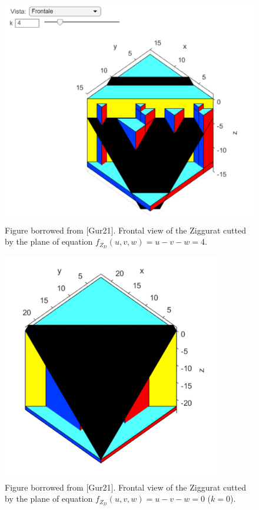 \documentclass[english, LaM, oneside, noexaminfo]{sapthesis}
\begin{document}
\begin{figure}[tb]
\centering
\includegraphics[height=10cm]{Ziggurat 3D.png}
\caption{Figure borrowed from [Gur21]. Frontal view of the Ziggurat cutted by the plane of equation $f_{Z_D}(u,v,w) = u-v-w = 4$.}\label{fig:Ziggurat 3D}
\end{figure}

\begin{figure}[tb]
\centering
\includegraphics[height=10cm]{Ziggurat 3D k=0.png}
\caption{Figure borrowed from [Gur21]. Frontal view of the Ziggurat cutted by the plane of equation $f_{Z_D}(u,v,w) = u-v-w = 0$ ($k=0$).}\label{fig:Ziggurat 3D k=0}
\end{figure}
\end{document}
